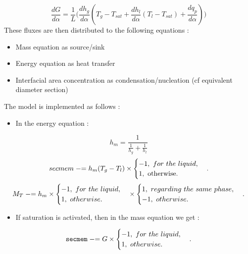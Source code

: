 \begin{equation}
   \frac{dG}{d\alpha}=\frac{1}{L}\Bigg(\frac{dh_g}{d\alpha}(T_g-T_{sat}+\frac{dh_l}{d\alpha}(T_l-T_{sat})+\frac{dq_p}{d\alpha}) \Bigg)
\end{equation}
These fluxes are then distributed to the following equations :
\begin{itemize}
    \item[\small \textcolor{blue}{\ding{109}}] Mass equation as source/sink
    \item[\small \textcolor{blue}{\ding{109}}] Energy equation as heat transfer
    \item[\small \textcolor{blue}{\ding{109}}] Interfacial area concentration as condensation/nucleation (cf equivalent diameter section)
\end{itemize}
The model is implemented as follows :\\
\begin{itemize}
    \item[\small \textcolor{blue}{\ding{109}}] In the energy equation :
\end{itemize}
\begin{equation}
    h_m=\frac{1}{\frac{1}{h_g}+\frac{1}{h_l}}
\end{equation}
\begin{equation}
    secmem \mathrel{-}= h_m(T_g-T_l)\times \begin{cases} -1,\ for\ the\ liquid, \\ 1,\ \text{otherwise}. \end{cases}.
\end{equation}
\begin{equation}
    M_T \minuseq h_m\times \begin{cases} -1,\ for\ the\ liquid, \\ 1,\ otherwise. \end{cases}\times \begin{cases} 1,\ regarding\ the\ same\ phase, \\ -1,\ otherwise. \end{cases}.
\end{equation}
\begin{itemize}
    \item[\small \textcolor{blue}{\ding{109}}] If saturation is activated, then in the mass equation we get :
\end{itemize}
\begin{equation}
    \texttt{secmem} \mathrel{-}= G\times \begin{cases} -1,\ for\ the\ liquid, \\ 1,\ otherwise. \end{cases}.
\end{equation}
